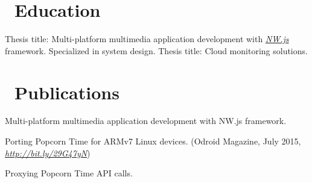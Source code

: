 \documentclass[hidelinks,11pt]{friggeri-cv}
\def\book{{\FA\faBook}}
\def\pencil{{\FA\faPencil}}
\begin{document}
\section{{\pencil}\ Education}
\begin{entrylist}
    {Thesis title: Multi-platform multimedia application development with \textit{\href{https://nwjs.io/}{NW.js}} framework.}
    {Specialized in system design. Thesis title: Cloud monitoring solutions.}
\end{entrylist}

\section{{\book}\ Publications}
Multi-platform multimedia application development with NW.js framework.

Porting Popcorn Time for ARMv7 Linux devices.
{\small (Odroid Magazine, July 2015, \textit{\href{http://bit.ly/29G47yN}{http://bit.ly/29G47yN}})}

Proxying Popcorn Time API calls.

\newpage
\end{document}
